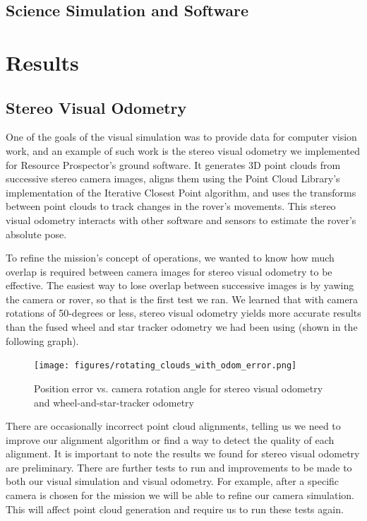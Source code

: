 \documentclass[twocolumn,letterpaper]{IEEEAerospaceCLS}  %
\begin{document}
\subsection{Science Simulation and Software}

\section{Results}

\subsection{Stereo Visual Odometry}
One of the goals of the visual simulation was to provide data for computer vision work, and an example of such work is the stereo visual odometry we implemented for Resource Prospector's ground software.
It generates 3D point clouds from successive stereo camera images, aligns them using the Point Cloud Library's implementation of the Iterative Closest Point algorithm, and uses the transforms between point clouds to track changes in the rover's movements.
This stereo visual odometry interacts with other software and sensors to estimate the rover's absolute pose.

To refine the mission's concept of operations, we wanted to know how much overlap is required between camera images for stereo visual odometry to be effective. 
The easiest way to lose overlap between successive images is by yawing the camera or rover, so that is the first test we ran. 
We learned that with camera rotations of 50-degrees or less, stereo visual odometry yields more accurate results than the fused wheel and star tracker odometry we had been using (shown in the following graph).
\begin{figure}[h!]
	\texttt{[image: figures/rotating\_clouds\_with\_odom\_error.png]}
    \caption{Position error vs. camera rotation angle for stereo visual odometry and wheel-and-star-tracker odometry}
\end{figure}

There are occasionally incorrect point cloud alignments, telling us we need to improve our alignment algorithm or find a way to detect the quality of each alignment.
It is important to note the results we found for stereo visual odometry are preliminary. 
There are further tests to run and improvements to be made to both our visual simulation and visual odometry. 
For example, after a specific camera is chosen for the mission we will be able to refine our camera simulation. 
This will affect point cloud generation and require us to run these tests again.
\end{document}
